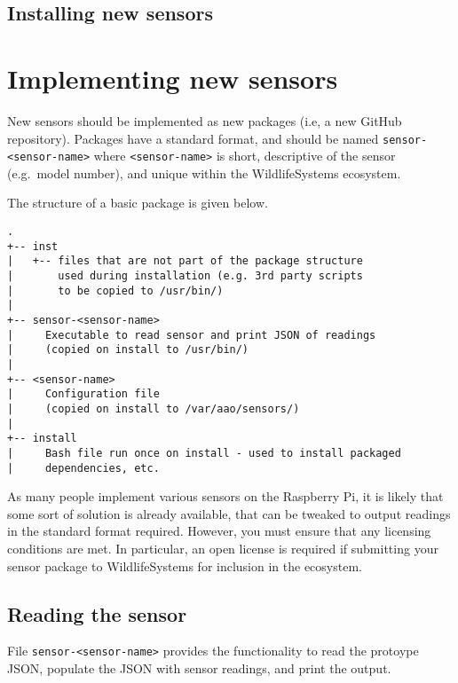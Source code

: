 \documentclass[
]{book}
\begin{document}
\hypertarget{installing-new-sensors}{%
\section{Installing new sensors}\label{installing-new-sensors}}

\hypertarget{implementing-new-sensors}{%
\chapter{Implementing new sensors}\label{implementing-new-sensors}}

New sensors should be implemented as new packages (i.e, a new GitHub repository). Packages have a standard format, and should be named \texttt{sensor-\textless{}sensor-name\textgreater{}} where \texttt{\textless{}sensor-name\textgreater{}} is short, descriptive of the sensor (e.g.~model number), and unique within the WildlifeSystems ecosystem.

The structure of a basic package is given below.

\begin{verbatim}
.
+-- inst
|   +-- files that are not part of the package structure
|       used during installation (e.g. 3rd party scripts 
|       to be copied to /usr/bin/)
|
+-- sensor-<sensor-name>
|     Executable to read sensor and print JSON of readings
|     (copied on install to /usr/bin/)
|
+-- <sensor-name>
|     Configuration file 
|     (copied on install to /var/aao/sensors/)
|
+-- install
|     Bash file run once on install - used to install packaged
|     dependencies, etc.
\end{verbatim}

As many people implement various sensors on the Raspberry Pi, it is likely that some sort of solution is already available, that can be tweaked to output readings in the standard format required. However, you must ensure that any licensing conditions are met. In particular, an open license is required if submitting your sensor package to WildlifeSystems for inclusion in the ecosystem.

\hypertarget{reading-the-sensor}{%
\section{Reading the sensor}\label{reading-the-sensor}}

File \texttt{sensor-\textless{}sensor-name\textgreater{}} provides the functionality to read the protoype JSON, populate the JSON with sensor readings, and print the output.
\end{document}
